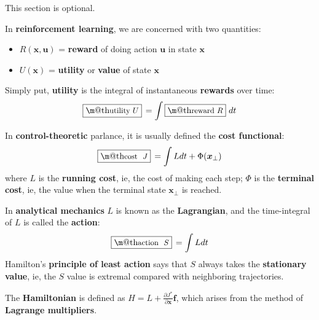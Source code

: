 \documentclass[orivec]{llncs}
\makeatletter
\newcommand{\emp}[1]{\textbf{#1}}
\newcommand{\vect}[1]{\boldsymbol{#1}}
\renewcommand{\boxed}[1]{\fbox{\m@th$\displaystyle\scalebox{0.9}{#1}$} \,}
\makeatother
\begin{document}
This section is optional.

In \emp{reinforcement learning}, we are concerned with two quantities:
\begin{itemize}
	\item $R(\vect{x}, \vect{u})$ = \emp{reward} of doing action $\vect{u}$ in state $\vect{x}$
	\item $U(\vect{x})$ = \emp{utility} or \emp{value} of state $\vect{x}$ 
\end{itemize}
Simply put, \textbf{utility} is the integral of instantaneous \textbf{rewards} over time:
\begin{equation}
\boxed{\mbox{utility} $U$} = \int \boxed{\mbox{reward} $R$} \,dt
\end{equation}

In \emp{control-theoretic} parlance, it is usually defined the \textbf{cost functional}:
\begin{equation}
\boxed{\mbox{cost } $J$} = \int L dt + \Phi(\vect{x}_\bot)
\end{equation}
where $L$ is the \textbf{running cost}, ie, the cost of making each step; $\Phi$ is the \textbf{terminal cost}, ie, the value when the terminal state $\vect{x}_\bot$ is reached.


In \emp{analytical mechanics} $L$ is known as the \textbf{Lagrangian}, and the time-integral of $L$ is called the \textbf{action}:
\begin{equation}
\boxed{\mbox{action } $S$} = \int L dt
\end{equation}
Hamilton's \emp{principle of least action} says that $S$ always takes the \textbf{stationary value}, ie, the $S$ value is extremal compared with neighboring trajectories.

The \textbf{Hamiltonian} is defined as $\displaystyle H = L + \frac{\partial J^*}{\partial \vect{x}} \vect{f}$, which arises from the method of \textbf{Lagrange multipliers}.  %
\end{document}
